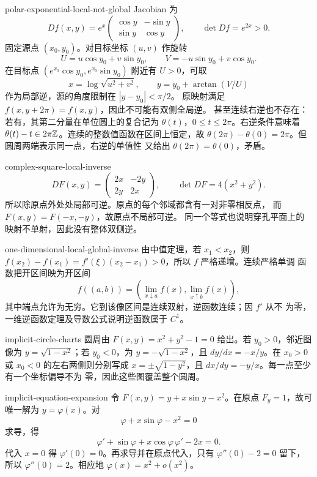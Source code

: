 \begin{solution}{polar-exponential-local-not-global}
Jacobian 为
\[
 Df(x,y)=e^x
 \begin{pmatrix}\cos y&-\sin y\\\sin y&\cos y\end{pmatrix},
 \qquad \det Df=e^{2x}>0.
\]
固定源点 \((x_0,y_0)\)。对目标坐标 \((u,v)\) 作旋转
\[
 U=u\cos y_0+v\sin y_0,\qquad V=-u\sin y_0+v\cos y_0.
\]
在目标点 \((e^{x_0}\cos y_0,e^{x_0}\sin y_0)\) 附近有 \(U>0\)，可取
\[
 x=\log\sqrt{u^2+v^2},\qquad y=y_0+\arctan(V/U)
\]
作为局部逆，源的角度限制在 \(|y-y_0|<\pi/2\)。
原映射满足 \(f(x,y+2\pi)=f(x,y)\)，因此不可能有双侧全局逆。
甚至连续右逆也不存在：若有，其第二分量在单位圆上的复合记为
\(\theta(t)\)，\(0\le t\le2\pi\)。右逆条件意味着
\(\theta(t)-t\in2\pi\mathbb{Z}\)。连续的整数值函数在区间上恒定，故
\(\theta(2\pi)-\theta(0)=2\pi\)。但圆周两端表示同一点，右逆的单值性
又给出 \(\theta(2\pi)=\theta(0)\)，矛盾。
\end{solution}

\begin{solution}{complex-square-local-inverse}
\[
 DF(x,y)=\begin{pmatrix}2x&-2y\\2y&2x\end{pmatrix},
 \qquad\det DF=4(x^2+y^2).
\]
所以除原点外处处局部可逆。原点的每个邻域都含有一对非零相反点，
而 \(F(x,y)=F(-x,-y)\)，故原点不局部可逆。
同一个等式也说明穿孔平面上的映射不单射，因此没有整体双侧逆。
\end{solution}

\begin{solution}{one-dimensional-local-global-inverse}
由中值定理，若 $x_1<x_2$，则
$f(x_2)-f(x_1)=f'(\xi)(x_2-x_1)>0$，所以 $f$ 严格递增。连续严格单调
函数把开区间映为开区间
\[
 f((a,b))=(\lim_{x\downarrow a}f(x),\lim_{x\uparrow b}f(x)),
\]
其中端点允许为无穷。它到该像区间是连续双射，逆函数连续；因 $f'$ 从不
为零，一维逆函数定理及导数公式说明逆函数属于 $C^1$。
\end{solution}

\begin{solution}{implicit-circle-charts}
圆周由 $F(x,y)=x^2+y^2-1=0$ 给出。若 $y_0>0$，邻近图像为
$y=\sqrt{1-x^2}$；若 $y_0<0$，为 $y=-\sqrt{1-x^2}$，且
$dy/dx=-x/y$。在 $x_0>0$ 或 $x_0<0$ 的左右两侧则分别写成
$x=\pm\sqrt{1-y^2}$，且 $dx/dy=-y/x$。每一点至少有一个坐标偏导不为
零，因此这些图覆盖整个圆周。
\end{solution}

\begin{solution}{implicit-equation-expansion}
令 $F(x,y)=y+x\sin y-x^2$。在原点 $F_y=1$，故可唯一解为
$y=\varphi(x)$。对
\[
 \varphi+x\sin\varphi-x^2=0
\]
求导，得
\[
 \varphi'+\sin\varphi+x\cos\varphi\,\varphi'-2x=0.
\]
代入 $x=0$ 得 $\varphi'(0)=0$。再求导并在原点代入，只有
$\varphi''(0)-2=0$ 留下，所以 $\varphi''(0)=2$。相应地
$\varphi(x)=x^2+o(x^2)$。
\end{solution}

